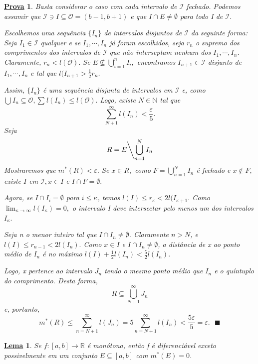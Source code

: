 \documentclass{article}
\newtheorem*{lemma*}{\underline{Lema}}
\newtheorem*{proof*}{\underline{Prova}}
\renewcommand\qedsymbol{$\blacksquare$}
\begin{document}
\begin{proof*}
  Basta considerar o caso com cada intervalo de \(\mathcal{I}\) fechado. Podemos assumir que
  \(\mathcal{I}\ni I \subseteq{\mathcal{O}=(b-1, b+1)}\) e que \(I\cap E \neq\emptyset\) para todo I
  de \(\mathcal{I}\). 

  Escolhemos uma sequência \(\{I_{n}\}\) de intervalos disjuntos de \(\mathcal{I}\) da
  seguinte forma: Seja \(I_{1}\in \mathcal{I}\) qualquer e se \(I_{1}, \cdots, I_{n}\) já foram
  escolhidos, seja \(r_{n}\) o supremo dos comprimentos dos intervalos de \(\mathcal{I}\) que não interseptam
  nenhum dos \(I_{1}, \cdots, I_{n}\). Claramente, \(r_{n} <  l(\mathcal{O}).\) Se 
  \(E\not\subseteq{\bigcup_{i=1}^{n}{I_{i}}},\) encontramos \(I_{n+1}\in \mathcal{I}\)
  disjunto de \(I_{1}, \cdots, I_{n}\) e tal que \(l(I_{n+1} > \frac{1}{2}r_{n}\).

  Assim, \(\{I_{n}\}\) é uma sequência disjunta de intervalos em \(\mathcal{I}\) e, como
  \(\bigcup_{}^{}{I_{n}\subseteq{\mathcal{O}}}, \sum\limits_{}^{}l(I_{n})\leq l(\mathcal{O}).\) Logo,
  existe \(N\in \mathbb{N}\) tal que 
    \[
      \sum\limits_{N+1}^{\infty} l(I_{n}) < \frac{\varepsilon }{5}.
    \]
  Seja 
    \[
      R = E\biggl\backslash\bigcup_{n=1}^{N}{I_{n}}\biggr.
    \]
  Mostraremos que \(m^{*}(R) < \varepsilon .\) Se \(x\in R,\) como \(F = \bigcup_{n=1}^{N}{I_{n}}\) é
  fechado e \(x\not\in F,\) existe \(I\) em \(\mathcal{I}, x\in I\) e \(I\cap F=\emptyset.\)

  Agora, se \(I\cap I_{i} = \emptyset\) para \(i\leq \kappa \), temos \(l(I)\leq r_{\kappa } < 2l(I_{\kappa +1}.\)
  Como \(\lim_{\kappa \to \infty}l(I_{\kappa }) = 0,\) o intervalo I deve intersectar
  pelo menos um dos intervalos \(I_{\kappa }.\)

  Seja n o menor inteiro tal que \(I\cap I_{n} \neq\emptyset\). Claramente \(n > N\), e
  \(l(I)\leq r_{n-1} < 2l(I_{n}).\) Como \(x\in I\) e \(I\cap I_{n} \neq\emptyset\), a distância de
  x ao ponto médio de \(I_{n}\) é no máximo \(l(I) + \frac{1}{2}l(I_{n}) < \frac{5}{2} l(I_{n}).\)

  Logo, x pertence ao intervalo \(J_{n}\) tendo o mesmo ponto médio que \(I_{n}\) e 
  o quíntuplo do comprimento. Desta forma, 
    \[
      R\subseteq{\bigcup_{N+1}^{\infty}{J_{n}}}
    \]
  e, portanto, 
    \[
      m^{*}(R)\leq \sum\limits_{n=N+1}^{\infty}l(J_{n}) = 5\sum\limits_{n=N+1}^{\infty}l(I_{n}) < \frac{5\varepsilon }{5} = \varepsilon .\text{ \qedsymbol}
    \]
\end{proof*}
\begin{lemma*}
  Se \(f:[a, b]\rightarrow \mathbb{R}\) é monótona, então f é diferenciável exceto 
  possivelmente em um conjunto \(E\subseteq{[a, b]}\) com \(m^{*}(E) = 0\).
\end{lemma*}
\end{document}
